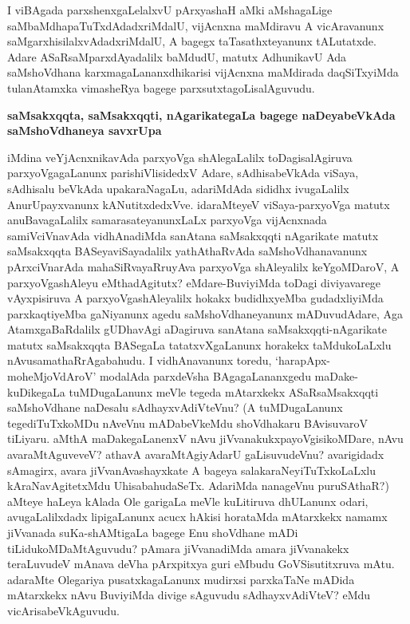 \medskip
\noindent
I viBAgada parxshenxgaLelalxvU pArxyashaH aMki aMshagaLige saMbaMdhapaTuTxdAdadxriMdalU, vijAcnxna maMdi\-ravu A vicAravanunx saMgarxhisilalxvAdadxriMdalU, A bagegx taTasathxte\-yanunx tALutatxde. Adare ASaRsaMparx\-dAyadalilx baMdudU, matutx AdhunikavU Ada saMshoVdhana karxmagaLananxdhikarisi vijAcnxna maMdi\-rada daqSiTx\-yiMda tula\-nAtamxka vimasheRya bagege parxsutxtagoLisalAguvudu.

{\bigskip
\noindent
{\large\bf saMsakxqqta, saMsakxqqti, nAgarikategaLa bagege naDeyabeVkAda saMshoVdhaneya savxrUpa}}\label{page53}

\medskip
\noindent
iMdina veYjAcnxnikavAda parxyoVga shAlegaLalilx toDagisalAgiruva parxyoVga\-gaLanunx parishiVli\-sidedxV Adare, sAdhisabeVkAda viSaya, sAdhisalu beVkAda upakaraNagaLu, adariMdAda sididhx ivugaLalilx Anu\-rUpayx\-vanunx kANutitxdedxVve. idaraMteyeV viSaya\--parxyoVga matutx anuBavagaLalilx samarasateyanunxLaLx parxyoVga vijAcnx\-nada samiV\-ciVnavAda vidhAnadiMda sanAtana saMsakxqqti nAgarikate matutx saMsakxqqta BASeya\break viSayadalilx yathAthaRvAda saMshoVdhanavanunx pArxciVnarAda mahaSiRvayaRru\break yAva parxyoVga shAle\-yalilx keY\-goM\-DaroV, A parxyoVgashAleyu eMthadA\-gitutx? eMdare-BuviyiMda toDagi diviyavarege vAyxpisiruva A parxyoVga\-shAle\-yalilx hokakx budidhxyeMba gudadxliyiMda parxkaqtiyeMba gaNiyanunx agedu saMshoV\-dhane\-yanunx mADuvudAdare, Aga AtamxgaBaRdalilx gUDhavAgi aDagiruva sanAtana saMsakxqqti\--nAgari\-kate matutx saMsakxqqta BASegaLa tatatxvXgaLanunx horakekx taMdukoLaLxlu nAvu\break samathaRrAgabahudu. I vidhAna\-vanunx toredu, `harapApx-moheMjoVdAroV' modalAda parxdeVsha BAgagaLananxgedu maDake-kuDikegaLa tuMDu\-gaLanunx meVle tegeda mAtarxkekx ASaRsaMsakxqqti saMshoVdhane naDesalu sAdhayxvAdiVteVnu? (A tuMDu\-gaLanunx tegediTuTxkoMDu nAveVnu mADabeVkeMdu shoVdhakaru BAvisuvaroV tiLiyaru. aMthA maDake\-gaLanenxV nAvu jiVvanakukxpayoVgisikoMDare, nAvu avaraMtAgu\-veveV? athavA avaraMtAgiyAdarU gaLisuvudeVnu? avarigidadx sAmagirx, avara jiVvanAvashayxkate A bageya salakaraNeyiTuTxkoLaLxlu kAraNa\-vAgi\-tetxMdu UhisabahudaSeTx. AdariMda nanageVnu puruSAthaR?) aMteye haLeya kAlada Ole garigaLa meVle kuLi\-tiruva dhULanunx odari, avugaLalilxdadx lipigaLanunx acucx hAkisi horataMda mAtarxkekx namamx jiVvanada suKa-shAMtigaLa bagege Enu shoVdhane mADi tiLidukoMDaMtAguvudu? pAmara jiVvanadiMda amara jiVvanakekx teraLuvudeV mAnava deVha \hbox{pArxpitxya} guri eMbudu GoVSisutitxruva mAtu. adaraMte Ole\-gariya pusatxkagaLanunx mudirxsi parxkaTaNe mADida mAtarxkekx nAvu BuviyiMda divige sAguvudu sAdhayx\-vAdiVteV? eMdu vicArisabeVkAguvudu.


